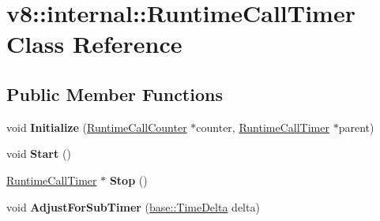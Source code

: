 \hypertarget{classv8_1_1internal_1_1_runtime_call_timer}{}\section{v8\+:\+:internal\+:\+:Runtime\+Call\+Timer Class Reference}
\label{classv8_1_1internal_1_1_runtime_call_timer}
\subsection*{Public Member Functions}
\begin{DoxyCompactItemize}
\item 
void {\bfseries Initialize} (\hyperlink{structv8_1_1internal_1_1_runtime_call_counter}{Runtime\+Call\+Counter} $\ast$counter, \hyperlink{classv8_1_1internal_1_1_runtime_call_timer}{Runtime\+Call\+Timer} $\ast$parent)\hypertarget{classv8_1_1internal_1_1_runtime_call_timer_a80f59b340c1e185c086e7550ca3caeb9}{}\label{classv8_1_1internal_1_1_runtime_call_timer_a80f59b340c1e185c086e7550ca3caeb9}

\item 
void {\bfseries Start} ()\hypertarget{classv8_1_1internal_1_1_runtime_call_timer_af23c41bd4792e5e9e31da920d841aebb}{}\label{classv8_1_1internal_1_1_runtime_call_timer_af23c41bd4792e5e9e31da920d841aebb}

\item 
\hyperlink{classv8_1_1internal_1_1_runtime_call_timer}{Runtime\+Call\+Timer} $\ast$ {\bfseries Stop} ()\hypertarget{classv8_1_1internal_1_1_runtime_call_timer_aaad4885dff64b104c001483d38ef2efa}{}\label{classv8_1_1internal_1_1_runtime_call_timer_aaad4885dff64b104c001483d38ef2efa}

\item 
void {\bfseries Adjust\+For\+Sub\+Timer} (\hyperlink{classv8_1_1base_1_1_time_delta}{base\+::\+Time\+Delta} delta)\hypertarget{classv8_1_1internal_1_1_runtime_call_timer_a06ed0fa2a5ff004845e8140a8f131b73}{}\label{classv8_1_1internal_1_1_runtime_call_timer_a06ed0fa2a5ff004845e8140a8f131b73}

\end{DoxyCompactItemize}
